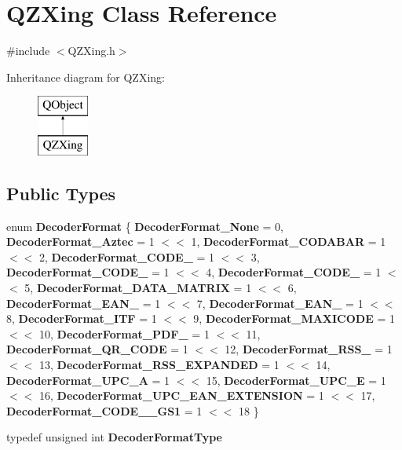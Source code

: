 \hypertarget{class_q_z_xing}{}\section{Q\+Z\+Xing Class Reference}
\label{class_q_z_xing}


{\ttfamily \#include $<$Q\+Z\+Xing.\+h$>$}

Inheritance diagram for Q\+Z\+Xing\+:\begin{figure}[H]
\begin{center}
\leavevmode
\includegraphics[height=2.000000cm]{class_q_z_xing}
\end{center}
\end{figure}
\subsection*{Public Types}
\begin{DoxyCompactItemize}
\item 
\mbox{\label{class_q_z_xing_a88e0c36a340bb40ab288b59a0107ff87}} 
enum {\bfseries Decoder\+Format} \{ \newline
{\bfseries Decoder\+Format\+\_\+\+None} = 0, 
{\bfseries Decoder\+Format\+\_\+\+Aztec} = 1 $<$$<$ 1, 
{\bfseries Decoder\+Format\+\_\+\+C\+O\+D\+A\+B\+AR} = 1 $<$$<$ 2, 
{\bfseries Decoder\+Format\+\_\+\+C\+O\+D\+E\+\_} = 1 $<$$<$ 3, 
\newline
{\bfseries Decoder\+Format\+\_\+\+C\+O\+D\+E\+\_} = 1 $<$$<$ 4, 
{\bfseries Decoder\+Format\+\_\+\+C\+O\+D\+E\+\_} = 1 $<$$<$ 5, 
{\bfseries Decoder\+Format\+\_\+\+D\+A\+T\+A\+\_\+\+M\+A\+T\+R\+IX} = 1 $<$$<$ 6, 
{\bfseries Decoder\+Format\+\_\+\+E\+A\+N\+\_} = 1 $<$$<$ 7, 
\newline
{\bfseries Decoder\+Format\+\_\+\+E\+A\+N\+\_} = 1 $<$$<$ 8, 
{\bfseries Decoder\+Format\+\_\+\+I\+TF} = 1 $<$$<$ 9, 
{\bfseries Decoder\+Format\+\_\+\+M\+A\+X\+I\+C\+O\+DE} = 1 $<$$<$ 10, 
{\bfseries Decoder\+Format\+\_\+\+P\+D\+F\+\_} = 1 $<$$<$ 11, 
\newline
{\bfseries Decoder\+Format\+\_\+\+Q\+R\+\_\+\+C\+O\+DE} = 1 $<$$<$ 12, 
{\bfseries Decoder\+Format\+\_\+\+R\+S\+S\+\_} = 1 $<$$<$ 13, 
{\bfseries Decoder\+Format\+\_\+\+R\+S\+S\+\_\+\+E\+X\+P\+A\+N\+D\+ED} = 1 $<$$<$ 14, 
{\bfseries Decoder\+Format\+\_\+\+U\+P\+C\+\_\+A} = 1 $<$$<$ 15, 
\newline
{\bfseries Decoder\+Format\+\_\+\+U\+P\+C\+\_\+E} = 1 $<$$<$ 16, 
{\bfseries Decoder\+Format\+\_\+\+U\+P\+C\+\_\+\+E\+A\+N\+\_\+\+E\+X\+T\+E\+N\+S\+I\+ON} = 1 $<$$<$ 17, 
{\bfseries Decoder\+Format\+\_\+\+C\+O\+D\+E\+\_\+\_\+\+G\+S1} = 1 $<$$<$ 18
 \}
\item 
\mbox{\label{class_q_z_xing_abb78017442ef7e6cc236f75bc1dc71e2}} 
typedef unsigned int {\bfseries Decoder\+Format\+Type}
\end{DoxyCompactItemize}
